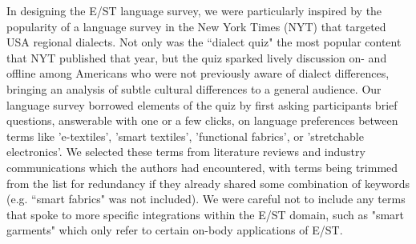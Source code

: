 \documentclass[manuscript,review,anonymous]{acmart}
\begin{document}
In designing the E/ST language survey, we were particularly inspired by the popularity of a language survey
in the New York Times (NYT) \cite{katz_how_2013} that targeted USA regional dialects. Not only was the ``dialect quiz" the most popular content that NYT published that year, but the quiz sparked lively discussion on- and offline among Americans who were not previously aware of dialect differences, bringing an analysis of subtle cultural differences to a general audience. Our language survey borrowed elements of the quiz by first asking participants brief questions, answerable with one or a few clicks, on language preferences between terms like 'e-textiles', 'smart textiles', 'functional fabrics', or 'stretchable electronics'.
We selected these terms from literature reviews and industry communications which the authors had encountered, with terms being trimmed from the list for redundancy if they already shared some combination of keywords (e.g. ``smart fabrics" was not included). We were careful not to include any terms that spoke to more specific integrations within the E/ST domain, such as "smart garments" which only refer to certain on-body applications of E/ST.
\end{document}
